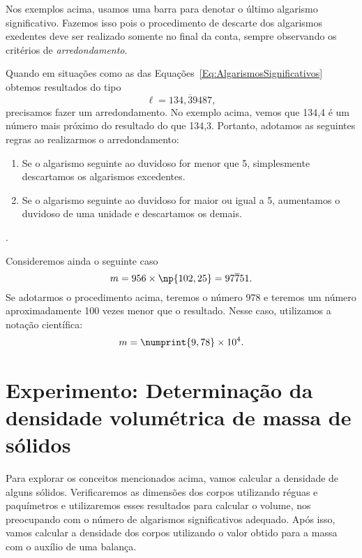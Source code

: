 Nos exemplos acima, usamos uma barra para denotar o último algarismo significativo. Fazemos isso pois o procedimento de descarte dos algarismos exedentes deve ser realizado somente no final da conta, sempre observando os critérios de \emph{arredondamento}.

Quando em situações como as das Equações~\eqref{Eq:AlgarismosSignificativos} obtemos resultados do tipo
\begin{equation}
     \ell = 134{,}\overline{3}9487,
\end{equation}
%
precisamos fazer um arredondamento. No exemplo acima, vemos que 134,4 é um número mais próximo do resultado do que 134,3. Portanto, adotamos as seguintes regras ao realizarmos o arredondamento:
\begin{enumerate}
     \item Se o algarismo seguinte ao duvidoso for menor que 5, simplesmente descartamos os algarismos excedentes.
     \item Se o algarismo seguinte ao duvidoso for maior ou igual a 5, aumentamos o duvidoso de uma unidade e descartamos os demais.
\end{enumerate}.

Consideremos ainda o seguinte caso
\begin{equation}
     m = 956 \times \np{102,25} = 97\overline{7}51.
\end{equation}
%
Se adotarmos o procedimento acima, teremos o número 978 e teremos um número aproximadamente 100 vezes menor que o resultado. Nesse caso, utilizamos a notação científica:
\begin{equation}
     m = \numprint{9,78}\times 10^{4}.
\end{equation}

\section{Experimento: Determinação da densidade volumétrica de massa de sólidos}

Para explorar os conceitos mencionados acima, vamos calcular a densidade de alguns sólidos. Verificaremos as dimensões dos corpos utilizando réguas e paquímetros e utilizaremos esses resultados para calcular o volume, nos preocupando com o número de algarismos significativos adequado. Após isso, vamos calcular a densidade dos corpos utilizando o valor obtido para a massa com o auxílio de uma balança.


